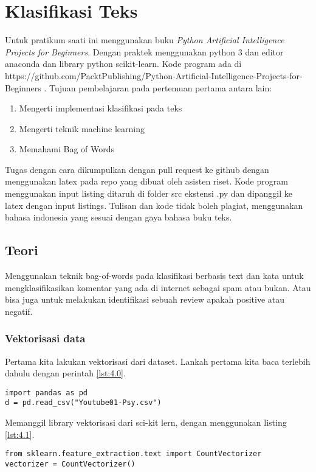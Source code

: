 \chapter{Klasifikasi Teks}

Untuk pratikum saati ini menggunakan buku \textit{Python Artificial Intelligence Projects for Beginners}\cite{eckroth2018python}. Dengan praktek menggunakan python 3 dan editor anaconda dan library python scikit-learn.
Kode program ada di https://github.com/PacktPublishing/Python-Artificial-Intelligence-Projects-for-Beginners .
Tujuan pembelajaran pada pertemuan pertama antara lain:
\begin{enumerate}
\item
Mengerti implementasi klasifikasi pada teks
\item
Mengerti teknik machine learning
\item
Memahami Bag of Words
\end{enumerate}

Tugas dengan cara dikumpulkan dengan pull request ke github dengan menggunakan latex pada repo yang dibuat oleh asisten riset. Kode program menggunakan input listing ditaruh di folder src ekstensi .py dan dipanggil ke latex dengan input listings. Tulisan dan kode tidak boleh plagiat, menggunakan bahasa indonesia yang sesuai dengan gaya bahasa buku teks.

\section{Teori}
Menggunakan teknik bag-of-words pada klasifikasi berbasis text dan kata untuk mengklasifikasikan komentar yang ada di internet sebagai spam atau bukan. Atau bisa juga untuk melakukan identifikasi sebuah review apakah positive atau negatif.


\subsection{Vektorisasi data}
Pertama kita lakukan vektorisasi dari dataset. Lankah pertama kita baca terlebih dahulu dengan perintah \ref{lst:4.0}.
\begin{lstlisting}[caption=Membaca data file txt,label={lst:4.0}]
import pandas as pd
d = pd.read_csv("Youtube01-Psy.csv")
\end{lstlisting}

Memanggil library vektorisasi dari sci-kit lern, dengan menggunakan listing \ref{lst:4.1}.

\begin{lstlisting}[caption=Instansiasi Vektorizer,label={lst:4.1}]
from sklearn.feature_extraction.text import CountVectorizer
vectorizer = CountVectorizer()
\end{lstlisting}


